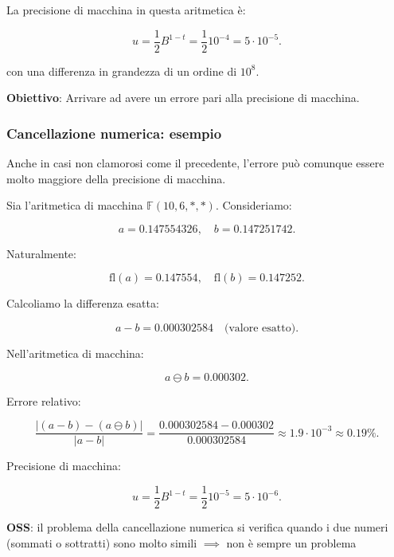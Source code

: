 \documentclass[a4paper, 11pt]{article}
\begin{document}
        La precisione di macchina in questa aritmetica è:


        \[
        u = \frac{1}{2} B^{1-t} = \frac{1}{2} 10^{-4} = 5 \cdot 10^{-5}.
        \]

        con una differenza in grandezza di un ordine di $10^8$.



        \textbf{Obiettivo}: Arrivare ad avere un errore pari alla precisione di macchina.
                

        \subsubsection*{Cancellazione numerica: esempio}

        Anche in casi non clamorosi come il precedente, l'errore può comunque essere molto maggiore della precisione di macchina.

        Sia l'aritmetica di macchina \( \mathbb{F}(10, 6, *, *) \). Consideriamo:


        \[
        a = 0.147554326, \quad b = 0.147251742.
        \]



        Naturalmente:


        \[
        \text{fl}(a) = 0.147554, \quad \text{fl}(b) = 0.147252.
        \]



        Calcoliamo la differenza esatta:


        \[
        a - b = 0.000302584 \quad \text{(valore esatto)}.
        \]



        Nell'aritmetica di macchina:


        \[
        a \ominus b = 0.000302.
        \]



        Errore relativo:


        \[
        \frac{|(a - b) - (a \ominus b)|}{|a - b|} = \frac{0.000302584 - 0.000302}{0.000302584} \approx 1.9 \cdot 10^{-3} \approx 0.19\%.
        \]



        Precisione di macchina:


        \[
        u = \frac{1}{2} B^{1-t} = \frac{1}{2} 10^{-5} = 5 \cdot 10^{-6}.
        \]



        \textbf{OSS}: il problema della cancellazione numerica si verifica quando i due numeri (sommati o sottratti) sono molto simili $\implies$ non è sempre un problema
\end{document}
